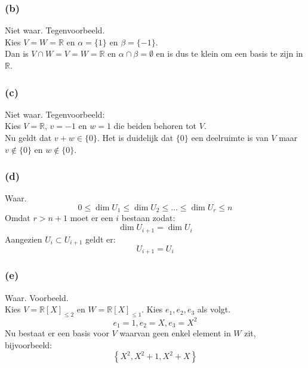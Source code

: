 \documentclass[lineaire_algebra_oplossingen.tex]{subfiles}
\begin{document}
\subsubsection*{(b)}
Niet waar. Tegenvoorbeeld.\\
Kies $V = W = \mathbb{R}$ en $\alpha = \{1\}$ en $\beta = \{-1\}$.\\
Dan is $V \cap W = V = W = \mathbb{R}$ en $\alpha \cap \beta = \emptyset$ en is dus te klein om een basis te zijn in $\mathbb{R}$.

\subsubsection*{(c)}
Niet waar. Tegenvoorbeeld:\\
Kies $V= \mathbb{R}$, $v=-1$ en $w=1$ die beiden behoren tot $V$.\\
Nu geldt dat $v+w \in \{0\}$. Het is duidelijk dat $\{0\}$ een deelruimte is van $V$ maar $v \not \in \{0\}$ en $w \not \in \{0\}$.

\subsubsection*{(d)}
Waar.
\[
0 \le \dim U_1 \le \dim U_2 \le \ldots \le \dim U_r \le n
\]
Omdat $r > n+1$ moet er een $i$ bestaan zodat:
\[
\dim U_{i+1} = \dim U_i
\]
Aangezien $U_i \subset U_{i+1}$ geldt er:
\[
U_{i+1} = U_i
\]

\subsubsection*{(e)}
Waar. Voorbeeld.\\
Kies $V = \mathbb{R}[X]_{\le 2}$ en $W = \mathbb{R}[X]_{\le 1}$.
Kies $e_1,e_2,e_3$ als volgt. 
\[
e_1 = 1, e_2 = X, e_3= X^2
\]
Nu bestaat er een basis voor $V$ waarvan geen enkel element in $W$ zit, bijvoorbeeld:
\[
\left\{
X^2, X^2+1, X^2+X
\right\}
\]
\end{document}
